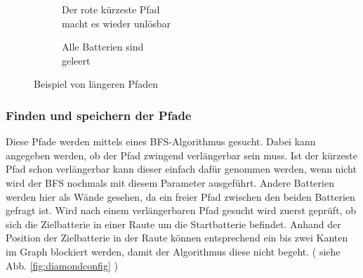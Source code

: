 \documentclass[a4paper,10pt,ngerman]{scrartcl}
\newcommand{\abbref}[1]{
  siehe Abb. \ref{#1}
}
\begin{document}
\begin{figure}[ht]
\begin{subfigure}{0.25\textwidth}
    \caption{Der rote kürzeste Pfad\\macht es wieder unlösbar}
  \end{subfigure}%
  \begin{subfigure}{0.25\textwidth}
    \centering
    \caption{Alle Batterien sind\\geleert}
  \end{subfigure}%
  \caption{Beispiel von längeren Pfaden}
  \label{fig:bsplongerpath}
\end{figure}

\subsubsection{Finden und speichern der Pfade}
Diese Pfade werden mittels eines BFS-Algorithmus gesucht. Dabei kann angegeben werden, ob der Pfad zwingend verlängerbar sein muss.
Ist der kürzeste Pfad schon verlängerbar kann dieser einfach dafür genommen werden, wenn nicht wird der BFS nochmals mit diesem Parameter ausgeführt.
Andere Batterien werden hier als Wände gesehen, da ein freier Pfad zwischen den beiden Batterien gefragt ist.
Wird nach einem verlängerbaren Pfad gesucht wird zuerst geprüft, ob sich die Zielbatterie in einer Raute um die Startbatterie befindet.
Anhand der Position der Zielbatterie in der Raute können entsprechend ein bis zwei Kanten im Graph blockiert werden,
damit der Algorithmus diese nicht begeht. (\abbref{fig:diamondconfig})
\end{document}
